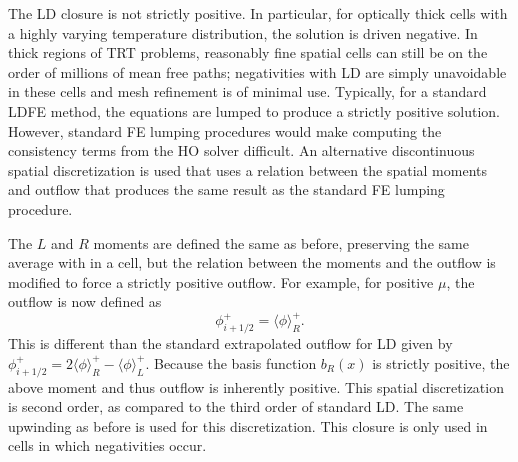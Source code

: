 \documentclass{mc2013}
\newcommand{\mom}[1]{\langle #1 \rangle}
\begin{document}

The LD closure is not strictly positive.  In particular, for
optically thick cells with a highly varying temperature distribution, the solution is driven negative.  In thick regions of
TRT problems, reasonably fine spatial cells can still be on the order of millions of mean
free paths; negativities with LD are simply unavoidable in these cells and mesh
refinement is of minimal use.  Typically, for a standard LDFE method,
the equations are lumped to produce a strictly positive solution. However, standard FE lumping
procedures would make computing the consistency terms from the HO solver difficult. 
An alternative discontinuous spatial discretization is used that uses a relation between the
spatial moments and outflow that produces the same result as the
standard FE lumping procedure.  

The $L$ and $R$ moments are defined the same as before,
preserving the same average with in a cell, but the relation between the moments and
the outflow is modified to force a strictly positive outflow.   For example, for positive $\mu$,
the outflow is now defined as
\begin{equation}
    \phi^+_{i+1/2} = \mom{\phi}_R^+.
\end{equation}
This is different than the standard extrapolated outflow for LD given by $\phi^+_{i+1/2} = 2\mom{\phi}_R^+ - \mom{\phi}_L^+$. 
Because the basis function $b_R(x)$ is strictly positive, the above moment and thus outflow is
inherently positive.  This spatial discretization is second order, as compared to the 
third order of standard LD.  The same upwinding as before is used for this
discretization. This closure is only used in cells in which negativities occur.

\end{document}
